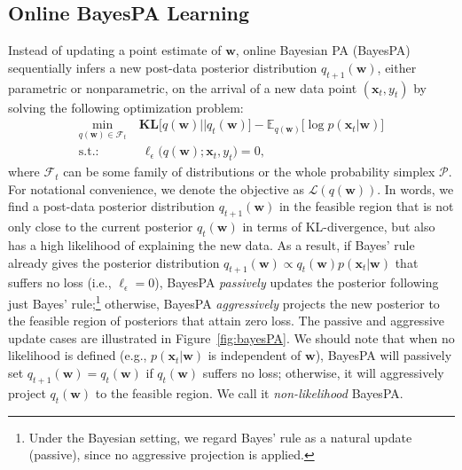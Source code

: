\documentclass[twoside,11pt]{article}
\newcommand{\xv}{\bm{x}}
\newcommand{\wv}{\bm{w}}
\newcommand{\prob}{\mathcal{P}}
\newcommand{\KL}{\textbf{KL}}
\begin{document}
\subsection{Online BayesPA Learning}
Instead of updating a point estimate of $\bm{w}$, online Bayesian PA (BayesPA) sequentially infers a new post-data posterior distribution $q_{t+1}(\bm{w})$, either parametric or nonparametric, on the arrival of a new data point $(\xv_t, y_t)$ by solving the following optimization problem:
\setlength\arraycolsep{1pt} \begin{equation}\label{eq:onlinepa}
\begin{array}{rl}
\underset{q(\bm{w}) \in \mathcal{F}_t}{\operatorname{min}} & ~\KL\Big[q(\bm{w}) || q_{t}(\bm{w}) \Big]-\mathbb{E}_{q(\bm{w})}\Big[\log p(\bm{x}_t | \bm{w})\Big] \\
\text{s.t.:} &~~ \ell_\epsilon\Big(q(\bm{w}); \bm{x}_t, y_t\Big) = 0,
\end{array}
\end{equation}
where $\mathcal{F}_t$ can be some family of distributions or the whole probability simplex $\prob$. For notational convenience, we denote the objective as $\mathcal{L}(q(\wv))$. In words, we find a post-data posterior distribution $q_{t+1}(\bm{w})$ in the feasible region that is not only close to the current posterior $q_t(\bm{w})$ in terms of KL-divergence, but also has a high likelihood of explaining the new data. %
As a result, if Bayes' rule already gives the posterior distribution $q_{t+1}(\bm{w}) \propto q_{t}(\bm{w}) p(\bm{x}_t | \bm{w})$ that suffers no loss (i.e., $\ell_\epsilon = 0$), BayesPA \emph{passively} updates the posterior following just Bayes' rule;\footnote{Under the Bayesian setting, we regard Bayes' rule as a natural update (passive), since no aggressive projection is applied.} otherwise, BayesPA \emph{aggressively} projects the new posterior to the feasible region of posteriors that attain zero loss. The passive and aggressive update cases are illustrated in Figure~\ref{fig:bayesPA}. We should note that when no likelihood is defined (e.g., $p(\xv_t|\wv)$ is independent of $\wv$), BayesPA will passively set $q_{t+1}(\wv) = q_t(\wv)$ if $q_t(\wv)$ suffers no loss; otherwise, it will aggressively project $q_t(\wv)$ to the feasible region. We call it {\it non-likelihood} BayesPA.
\end{document}

